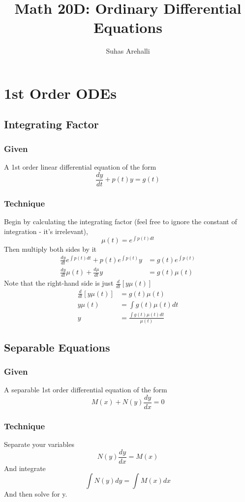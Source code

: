 \documentclass[11pt]{article}
\title{Math 20D: Ordinary Differential Equations}
\author{Suhas Arehalli}
\begin{document}
\maketitle

\section{1st Order ODEs}
\subsection{Integrating Factor}
\subsubsection{Given}
A 1st order linear differential equation of the form
    \[ \frac{dy}{dt} + p(t)y = g(t) \]
\subsubsection{Technique}
Begin by calculating the integrating factor (feel free to ignore the constant of integration - it's 
irrelevant),
    \[ \mu (t) = e^{\int p(t)dt} \]
Then multiply both sides by it
\begin{align*}
    \frac{dy}{dt} e^{\int p(t)dt} + p(t)e^{\int p(t)}y &= g(t)e^{\int p(t)}  \\
    \frac{dy}{dt} \mu (t) + \frac{d\mu}{dt}y &= g(t)\mu (t) 
\end{align*}
Note that the right-hand side is just $\frac{d}{dt}[y \mu (t)]$
\begin{align*}
    \frac{d}{dt}[y \mu (t)] &= g(t)\mu (t) \\
    y \mu(t) &= \int g(t)\mu (t)dt \\
    y &= \frac{\int g(t) \mu (t)dt}{\mu (t)}
\end{align*}
\subsection{Separable Equations}
\subsubsection{Given}
A separable 1st order differential equation of the form
    \[ M(x) + N(y)\frac{dy}{dx} = 0 \]
\subsubsection{Technique}
Separate your variables
    \[ N(y)\frac{dy}{dx} = M(x) \]
And integrate
    \[ \int N(y)dy = \int M(x)dx \]
And then solve for y.
\end{document}
